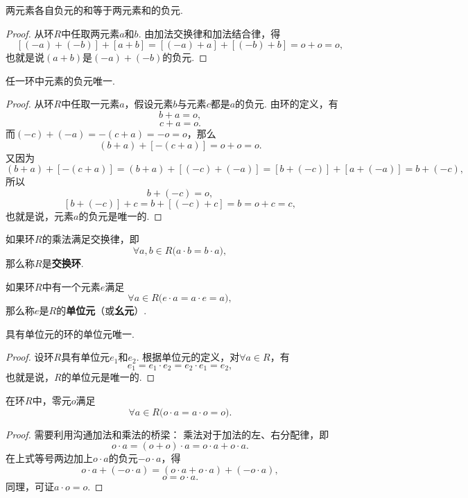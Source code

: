 \begin{property}
两元素各自负元的和等于两元素和的负元.
\begin{proof}
从环\(R\)中任取两元素\(a\)和\(b\).
由加法交换律和加法结合律，得\[
[(-a) + (-b)] + [a + b]
= [(-a) + a] + [(-b) + b]
= o + o = o,
\]也就是说\((a+b)\)是\((-a) + (-b)\)的负元.
\end{proof}
\end{property}

\begin{property}
任一环中元素的负元唯一.
\begin{proof}
从环\(R\)中任取一元素\(a\)，假设元素\(b\)与元素\(c\)都是\(a\)的负元.
由环的定义，有\[
b + a = o,
\]\[
c + a = o.
\]而\((-c) + (-a) = -(c + a) = -o = o\)，那么\[
(b + a) + [-(c + a)]
= o + o = o.
\]又因为\[
(b + a) + [-(c + a)]
= (b + a) + [(-c) + (-a)]
= [b + (-c)] + [a + (-a)]
= b + (-c),
\]所以\[
b + (-c) = o,
\]\[
[b + (-c)] + c = b + [(-c) + c] = b = o + c = c,
\]也就是说，元素\(a\)的负元是唯一的.
\end{proof}
\end{property}

\begin{definition}
如果环\(R\)的乘法满足交换律，即\[
\forall a,b \in R \bigl( a \cdot b = b \cdot a \bigr),
\]那么称\(R\)是\textbf{交换环}.
\end{definition}

\begin{definition}
如果环\(R\)中有一个元素\(e\)满足\[
\forall a \in R \bigl( e \cdot a = a \cdot e = a \bigr),
\]那么称\(e\)是\(R\)的\textbf{单位元}（或\textbf{幺元}）.
\end{definition}

\begin{property}
具有单位元的环的单位元唯一.
\begin{proof}
设环\(R\)具有单位元\(e_1\)和\(e_2\).
根据单位元的定义，对\(\forall a \in R\)，有\[
e_1 = e_1 \cdot e_2 = e_2 \cdot e_1 = e_2,
\]也就是说，\(R\)的单位元是唯一的.
\end{proof}
\end{property}

\begin{theorem}[乘零定理]
在环\(R\)中，零元\(o\)满足\[
\forall a \in R \bigl( o \cdot a = a \cdot o = o \bigr).
\]
\begin{proof}
需要利用沟通加法和乘法的桥梁：
乘法对于加法的左、右分配律，即\[
o \cdot a = (o + o) \cdot a = o \cdot a + o \cdot a.
\]在上式等号两边加上\(o \cdot a\)的负元\(-o \cdot a\)，得\[
o \cdot a + (- o \cdot a) = (o \cdot a + o \cdot a) + (- o \cdot a),
\]\[
o = o \cdot a.
\]同理，可证\(a \cdot o = o\).
\end{proof}
\end{theorem}

